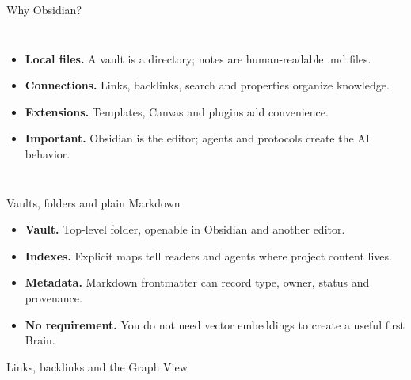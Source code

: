 \begin{frame}{Why Obsidian?}
\begin{columns}[c,onlytextwidth]
\begin{itemize}\setlength{\itemsep}{.5em}\small
\item \textbf{Local files.} A vault is a directory; notes are human-readable .md files.
\item \textbf{Connections.} Links, backlinks, search and properties organize knowledge.
\item \textbf{Extensions.} Templates, Canvas and plugins add convenience.
\item \textbf{Important.} Obsidian is the editor; agents and protocols create the AI behavior.
\end{itemize}
\end{columns}
\end{frame}

\begin{frame}{Vaults, folders and plain Markdown}
\begin{itemize}\setlength{\itemsep}{0.85em}
\item \textbf{Vault.} Top-level folder, openable in Obsidian and another editor.
\item \textbf{Indexes.} Explicit maps tell readers and agents where project content lives.
\item \textbf{Metadata.} Markdown frontmatter can record type, owner, status and provenance.
\item \textbf{No requirement.} You do not need vector embeddings to create a useful first Brain.
\end{itemize}
\end{frame}

\begin{frame}{Links, backlinks and the Graph View}
\begin{center}\end{center}
\end{frame}

